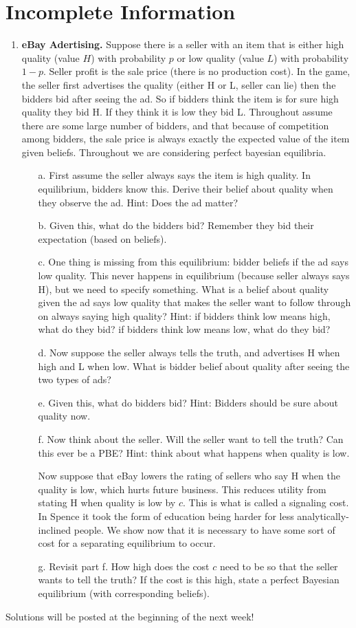 \documentclass{article}
\begin{document}
\section{Incomplete Information}
\begin{enumerate}
    \item \textbf{eBay Adertising.} Suppose there is a seller with an item that is either high quality (value $H$) with probability $p$ or low quality (value $L$) with probability $1-p$. Seller profit is the sale price (there is no production cost). In the game, the seller first advertises the quality (either H or L, seller can lie) then the bidders bid after seeing the ad. So if bidders think the item is for sure high quality they bid H. If they think it is low they bid L. Throughout assume there are some large number of bidders, and that because of competition among bidders, the sale price is always exactly the expected value of the item given beliefs. Throughout we are considering perfect bayesian equilibria.
    \begin{enumerate}
        \item[a.] First assume the seller always says the item is high quality. In equilibrium, bidders know this. Derive their belief about quality when they observe the ad. Hint: Does the ad matter?
        \item[b.] Given this, what do the bidders bid? Remember they bid their expectation (based on beliefs).
        \item[c.] One thing is missing from this equilibrium: bidder beliefs if the ad says low quality. This never happens in equilibrium (because seller always says H), but we need to specify something. What is a belief about quality given the ad says low quality that makes the seller want to follow through on always saying high quality? Hint: if bidders think low means high, what do they bid? if bidders think low means low, what do they bid?
        \item[d.] Now suppose the seller always tells the truth, and advertises H when high and L when low. What is bidder belief about quality after seeing the two types of ads?
        \item[e.] Given this, what do bidders bid? Hint: Bidders should be sure about quality now.
        \item[f.] Now think about the seller. Will the seller want to tell the truth? Can this ever be a PBE? Hint: think about what happens when quality is low.
        
        Now suppose that eBay lowers the rating of sellers who say H when the quality is low, which hurts future business. This reduces utility from stating H when quality is low by $c$. This is what is called a signaling cost. In Spence it took the form of education being harder for less analytically-inclined people. We show now that it is necessary to have some sort of cost for a separating equilibrium to occur.
        
        \item[g.] Revisit part f. How high does the cost $c$ need to be so that the seller wants to tell the truth? If the cost is this high, state a perfect Bayesian equilibrium (with corresponding beliefs).
    \end{enumerate}
\end{enumerate}
Solutions will be posted at the beginning of the next week!
\end{document}
